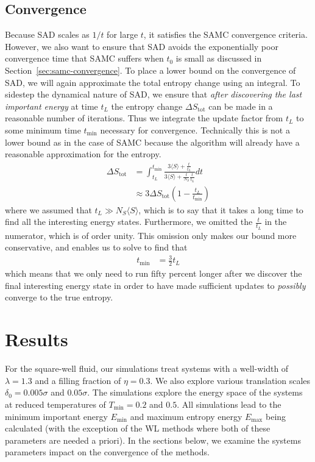 \documentclass[letterpaper,twocolumn,amsmath,amssymb,pre,aps,10pt]{revtex4-1}
\begin{document}
\subsection{Convergence}
Because SAD scales as $1/t$ for large $t$, it satisfies the SAMC
convergence criteria.  However, we also want to ensure that SAD avoids
the exponentially poor convergence time that SAMC suffers when $t_0$ is
small as discussed in Section~\ref{sec:samc-convergence}.
To place a lower bound on the convergence of SAD, we will again
approximate the total entropy change using an integral.  To sidestep
the dynamical nature of SAD, we ensure that \emph{after discovering the
last important energy} at time $t_L$ the entropy change
$\Delta S_{\text{tot}}$ can be made in a reasonable number of iterations.
Thus we integrate the update factor from $t_L$ to some minimum time
$t_{\min}$ necessary for convergence.  Technically this is not a lower
bound as in the case of SAMC because the algorithm will already have a
reasonable approximation for the entropy.
\begin{align}
\Delta S_{\text{tot}} &= \int_{t_L}^{t_{\min}}
     \frac{
       3\langle S\rangle + \frac{t}{t_L}
     }{
       3\langle S\rangle + \frac{t}{N_S}\frac{t}{t_L}
     } dt \\
&\approx 3\Delta S_{\text{tot}} \left(1-\frac{t_L}{t_{\min}}\right)
\end{align}
where we assumed that $t_L\gg N_S\langle S\rangle$, which is to say
that it takes a long time to find all the interesting energy states.
Furthermore, we omitted the $\frac{t}{t_L}$ in the numerator, which is
of order unity.  This omission only makes our bound more conservative,
and enables us to solve to find that
\begin{align}
  t_{\min} &= \frac32 t_L
\end{align}
which means that we only need to run fifty percent longer after we
discover the final interesting energy state in order to have made
sufficient updates to \emph{possibly} converge to the true entropy.

\section{Results}\label{sec:results}

For the square-well fluid, our simulations treat systems with a
well-width of $\lambda = 1.3$ and a filling fraction of
$\eta = 0.3$. We also explore various translation scales $\delta_0 = 0.005\sigma$ and
$0.05\sigma$. The simulations explore the
energy space of the systems at reduced temperatures of
$T_{\text{min}} = 0.2$ and $0.5$.  All simulations lead to the minimum important
energy $E_{\min}$ and maximum entropy energy $E_{\max}$
being calculated (with the exception of the WL methods where both
of these parameters are needed a priori).  In the sections below, we
examine the systems parameters impact on the convergence of the methods.
\end{document}
